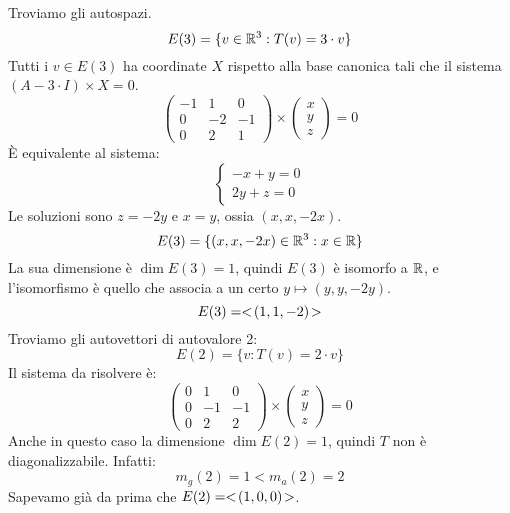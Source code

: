 \begin{exmp}
Troviamo gli autospazi.
\[
E(3) = \{ v \in \mathbb{R}^3 : T(v) = 3 \cdot v \}
\]
Tutti i $v \in E(3)$ ha coordinate $X$ rispetto alla base canonica tali che il sistema $(A - 3 \cdot I) \times X = 0$.
\[
\begin{pmatrix}
-1 & 1 & 0 \\
0 & -2 & -1 \\
0 & 2 & 1
\end{pmatrix}
\times
\begin{pmatrix}
x \\ y \\ z 
\end{pmatrix} = 0 
\]
\`E equivalente al sistema:
\[
\begin{cases}
-x + y = 0 \\
2y + z = 0
\end{cases}
\]
Le soluzioni sono $z = - 2 y$ e $x = y$, ossia $(x, x, -2x)$.
\[
E(3) = \{ (x,x,-2x) \in \mathbb{R}^3 : x \in \mathbb{R} \}
\]
La sua dimensione \`e $\dim E(3) = 1$, quindi $E(3)$ \`e isomorfo a $\mathbb{R}$, e l'isomorfismo \`e quello che associa a un certo $y \mapsto (y, y, -2y)$.
\[
E(3) = <\!{(1,1,-2)}\!>
\]
Troviamo gli autovettori di autovalore 2:
\[
E(2) = \{ v : T(v) = 2 \cdot v \}
\]
Il sistema da risolvere \`e:
\[
\begin{pmatrix}
0 & 1 & 0 \\
0 & -1 & -1 \\
0 & 2 & 2
\end{pmatrix}
\times
\begin{pmatrix}
x \\ y \\ z
\end{pmatrix} = 0
\]
Anche in questo caso la dimensione $\dim E(2) = 1$, quindi $T$ non \`e diagonalizzabile. Infatti:
\[
m_g(2) = 1 < m_a(2) = 2
\]
Sapevamo gi\`a da prima che $E(2) = <\!{(1,0,0)}\!>$.
\end{exmp}
